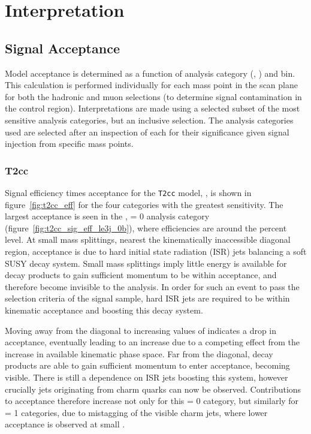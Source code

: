 \chapter{Interpretation}
\label{ch:9}

\ifpdf
    \graphicspath{{Chapter9/Figs/Raster/}{Chapter9/Figs/PDF/}{Chapter9/Figs/}}
\else
    \graphicspath{{Chapter9/Figs/Vector/}{Chapter9/Figs/}}
\fi

\section{Signal Acceptance}  %
\label{sec:interpretation_acceptance}

Model acceptance is determined as a function of analysis category (\nb, \nj) and
\HT bin. This calculation is performed individually for each mass point in the
scan plane for both the hadronic and muon selections (to determine 
signal contamination in the control region). Interpretations are made using a
selected subset of the most sensitive analysis 
categories, but an inclusive \HT selection. The analysis categories used are 
selected after an inspection of each for their significance given signal 
injection from specific mass points.

\subsection{T2cc}
\label{sec:t2cc_eff}
Signal efficiency times acceptance for the \texttt{T2cc} model, \Ttwocc,  is shown in 
figure~\ref{fig:t2cc_eff} for the four categories with the greatest sensitivity.
The largest acceptance is seen in the \njlow, 
\nb= 0 analysis category (figure~\ref{fig:t2cc_sig_eff_le3j_0b}), where efficiencies
are around the percent level. At 
small mass splittings, nearest the kinematically inaccessible diagonal region, 
acceptance is due to hard initial state radiation (ISR) jets balancing a soft 
SUSY decay system. Small mass splittings imply little energy is available for 
decay products to gain sufficient momentum to be within acceptance, and therefore 
become invisible to the analysis. In order for such an event to pass the 
selection criteria of the signal sample, hard ISR jets are required to be within
kinematic acceptance and boosting this decay system.

Moving away from the 
diagonal to increasing values of \deltam indicates a drop in acceptance, 
eventually leading to an increase due to a competing effect from the increase in
available kinematic phase space. Far from the diagonal, decay products are able 
to gain sufficient momentum to enter acceptance, becoming visible. There
is still a dependence on ISR jets boosting this system, however crucially jets 
originating from charm quarks can now be observed. Contributions to acceptance
therefore increase not only for this \nb= 0 category, but similarly for \nb= 1
categories, due to mistagging of the visible charm jets, where lower
acceptance is observed at small \deltam.

